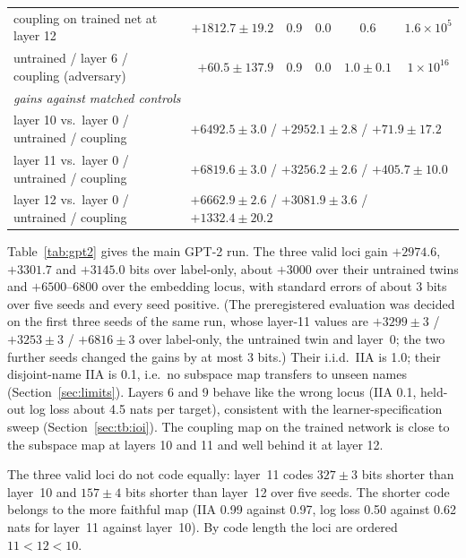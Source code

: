 \documentclass[11pt,a4paper]{article}
\begin{document}
\begin{table}[htbp]
{\begin{tabular}{lrcccc}
coupling on trained net at layer 12 & $+1812.7\pm19.2$ & 0.9 & 0.0 & 0.6 & $1.6\times10^{5}$\\
untrained / layer 6 / coupling (adversary) & $+60.5\pm137.9$ & 0.9 & 0.0 & $1.0\pm0.1$ & $1\times10^{16}$\\
\midrule
\multicolumn{6}{l}{\emph{gains against matched controls}}\\
layer 10 vs.\ layer 0 / untrained / coupling & \multicolumn{5}{l}{$+6492.5\pm3.0$ / $+2952.1\pm2.8$ / $+71.9\pm17.2$}\\
layer 11 vs.\ layer 0 / untrained / coupling & \multicolumn{5}{l}{$+6819.6\pm3.0$ / $+3256.2\pm2.6$ / $+405.7\pm10.0$}\\
layer 12 vs.\ layer 0 / untrained / coupling & \multicolumn{5}{l}{$+6662.9\pm2.6$ / $+3081.9\pm3.6$ / $+1332.4\pm20.2$}\\
\bottomrule
\end{tabular}%
}
\end{table}

Table~\ref{tab:gpt2} gives the main GPT-2 run. The three valid loci gain $+2974.6$, $+3301.7$ and $+3145.0$ bits over label-only, about $+3000$ over their untrained twins and $+6500$--$6800$ over the embedding locus, with standard errors of about 3 bits over five seeds and every seed positive. (The preregistered evaluation was decided on the first three seeds of the same run, whose layer-11 values are $+3299\pm3$ / $+3253\pm3$ / $+6816\pm3$ over label-only, the untrained twin and layer~0; the two further seeds changed the gains by at most 3 bits.) Their i.i.d.\ IIA is 1.0; their disjoint-name IIA is 0.1, i.e.\ no subspace map transfers to unseen names (Section~\ref{sec:limits}). Layers 6 and 9 behave like the wrong locus (IIA 0.1, held-out log loss about 4.5 nats per target), consistent with the learner-specification sweep (Section~\ref{sec:tb:ioi}). The coupling map on the trained network is close to the subspace map at layers 10 and 11 and well behind it at layer 12.

The three valid loci do not code equally: layer~11 codes $327\pm3$ bits shorter than layer~10 and $157\pm4$ bits shorter than layer~12 over five seeds. The shorter code belongs to the more faithful map (IIA 0.99 against 0.97, log loss 0.50 against 0.62 nats for layer~11 against layer~10). By code length the loci are ordered $11 < 12 < 10$.
\end{document}
